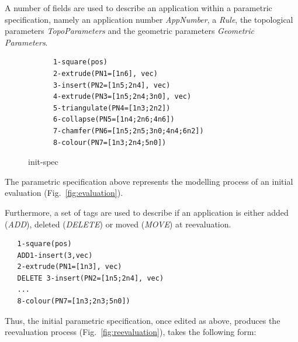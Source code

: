 A number of fields are used to describe an application within a parametric
specification, namely an application number \textit{AppNumber}, a \textit{Rule},
the topological parameters \textit{TopoParameters} and the geometric parameters
\textit{Geometric Parameters}. %
%
\begin{figure}[h!]
  \centering
    \begin{verbatim}
      1-square(pos)
      2-extrude(PN1=[1n6], vec)
      3-insert(PN2=[1n5;2n4], vec)
      4-extrude(PN3=[1n5;2n4;3n0], vec)
      5-triangulate(PN4=[1n3;2n2])
      6-collapse(PN5=[1n4;2n6;4n6])
      7-chamfer(PN6=[1n5;2n5;3n0;4n4;6n2])
      8-colour(PN7=[1n3;2n4;5n0])
    \end{verbatim}
  \caption{init-spec}
  \label{fig:init-spec}
\end{figure}
%
%
The parametric specification above represents the modelling process of an
initial evaluation (Fig.~\ref{fig:evaluation}). %

Furthermore, a set of tags are used to describe if an application is either
added (\textit{ADD}), deleted (\textit{DELETE}) or moved (\textit{MOVE}) at
reevaluation. %


\begin{verbatim}
   1-square(pos)
   ADD1-insert(3,vec)
   2-extrude(PN1=[1n3], vec)
   DELETE 3-insert(PN2=[1n5;2n4], vec)
   ...
   8-colour(PN7=[1n3;2n3;5n0])
\end{verbatim}

Thus, the initial parametric specification, once edited as above, produces the
reevaluation process (Fig.~\ref{fig:reevaluation}), takes the following form:


